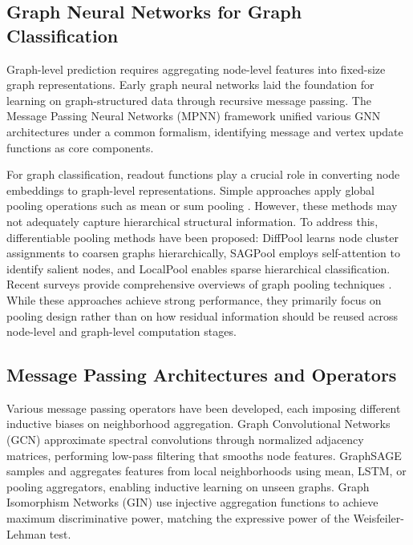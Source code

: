 \subsection{Graph Neural Networks for Graph Classification}

Graph-level prediction requires aggregating node-level features into fixed-size graph representations. Early graph neural networks \cite{gori2005new} laid the foundation for learning on graph-structured data through recursive message passing. The Message Passing Neural Networks (MPNN) framework \cite{gilmer2017neural} unified various GNN architectures under a common formalism, identifying message and vertex update functions as core components.

For graph classification, readout functions play a crucial role in converting node embeddings to graph-level representations. Simple approaches apply global pooling operations such as mean or sum pooling \cite{duvenaud2015convolutional}. However, these methods may not adequately capture hierarchical structural information. To address this, differentiable pooling methods have been proposed: DiffPool \cite{ying2018hierarchical} learns node cluster assignments to coarsen graphs hierarchically, SAGPool \cite{lee2019self} employs self-attention to identify salient nodes, and LocalPool \cite{cangea2018towards} enables sparse hierarchical classification. Recent surveys provide comprehensive overviews of graph pooling techniques \cite{liu2022graph,li2024graph}. While these approaches achieve strong performance, they primarily focus on pooling design rather than on how residual information should be reused across node-level and graph-level computation stages.

\subsection{Message Passing Architectures and Operators}

Various message passing operators have been developed, each imposing different inductive biases on neighborhood aggregation. Graph Convolutional Networks (GCN) \cite{kipf2016semi} approximate spectral convolutions through normalized adjacency matrices, performing low-pass filtering that smooths node features. GraphSAGE \cite{hamilton2017inductive} samples and aggregates features from local neighborhoods using mean, LSTM, or pooling aggregators, enabling inductive learning on unseen graphs. Graph Isomorphism Networks (GIN) \cite{xu2018powerful} use injective aggregation functions to achieve maximum discriminative power, matching the expressive power of the Weisfeiler-Lehman test.

